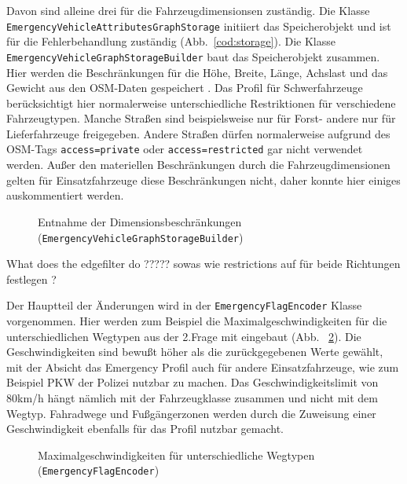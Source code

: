 \documentclass[12pt,a4paper]{article}
\begin{document}
Davon sind alleine drei für die Fahrzeugdimensionsen zuständig.
Die Klasse \lstinline!EmergencyVehicleAttributesGraphStorage! initiiert das Speicherobjekt und ist für die Fehlerbehandlung zuständig (Abb.~\ref{cod:storage}).
Die Klasse \lstinline!EmergencyVehicleGraphStorageBuilder! baut das Speicherobjekt zusammen. Hier werden die Beschränkungen für die Höhe, Breite, Länge, Achslast und das Gewicht aus den OSM-Daten gespeichert . Das Profil für Schwerfahrzeuge berücksichtigt hier normalerweise unterschiedliche Restriktionen für verschiedene Fahrzeugtypen. Manche Straßen sind beispielsweise nur für Forst- andere nur für Lieferfahrzeuge freigegeben. Andere Straßen dürfen normalerweise aufgrund des OSM-Tags \lstinline!access=private! oder \lstinline!access=restricted! gar nicht verwendet werden. Außer den materiellen Beschränkungen durch die Fahrzeugdimensionen gelten für Einsatzfahrzeuge diese Beschränkungen nicht, daher konnte hier einiges auskommentiert werden.

\begin{figure}[h]

\caption{Entnahme der Dimensionsbeschränkungen (\lstinline!EmergencyVehicleGraphStorageBuilder!)}
\label{cod:builder}
\end{figure}

What does the edgefilter do ????? sowas wie restrictions auf für beide Richtungen festlegen ?

Der Hauptteil der Änderungen wird in der \lstinline!EmergencyFlagEncoder! Klasse vorgenommen. Hier werden zum Beispiel die Maximalgeschwindigkeiten für die unterschiedlichen Wegtypen aus der 2.Frage mit eingebaut (Abb. ~\ref{cod:flag}). Die Geschwindigkeiten sind bewußt höher als die zurückgegebenen Werte gewählt, mit der Absicht das Emergency Profil auch für andere Einsatzfahrzeuge, wie zum Beispiel PKW der Polizei nutzbar zu machen. Das Geschwindigkeitslimit von 80km/h hängt nämlich mit der Fahrzeugklasse zusammen und nicht mit dem Wegtyp. Fahradwege und Fußgängerzonen werden durch die Zuweisung einer Geschwindigkeit ebenfalls für das Profil nutzbar gemacht. 

\begin{figure}[h]

\caption{Maximalgeschwindigkeiten für unterschiedliche Wegtypen (\lstinline!EmergencyFlagEncoder!)}
\label{cod:flag}
\end{figure}
\end{document}
